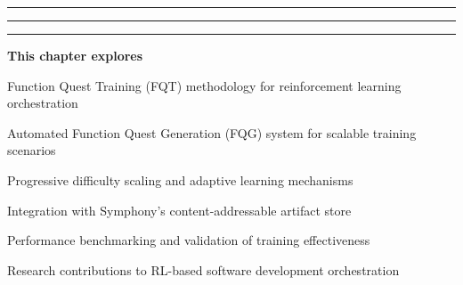 \vspace{0.5cm}

\begin{center}
\textcolor{brandAccent}{
\rule{2cm}{0.8pt} \quad
\raisebox{-0.2ex}{\Large$\diamond$} \quad
\rule{4cm}{0.8pt} \quad
\raisebox{-0.2ex}{\Large$\diamond$} \quad
\rule{2cm}{0.8pt}
}
\end{center}

\vspace{2cm}

\begin{tcolorbox}[
    enhanced,
    colback=white,
    colframe=brandPrimary!40,
    boxrule=1pt,
    arc=12pt,
    drop shadow={brandPrimary!20},
    left=1.5cm,
    right=1.5cm,
    top=1.2cm,
    bottom=1.2cm,
    before upper={\parindent0pt}
]
\begin{center}
{\Large\textbf{\textcolor{brandPrimary}{This chapter explores}}}
\end{center}

\vspace{0.8cm}

\begin{compactlist}
    \item {\large Function Quest Training (FQT) methodology for reinforcement learning orchestration}
    \item {\large Automated Function Quest Generation (FQG) system for scalable training scenarios}
    \item {\large Progressive difficulty scaling and adaptive learning mechanisms}
    \item {\large Integration with Symphony's content-addressable artifact store}
    \item {\large Performance benchmarking and validation of training effectiveness}
    \item {\large Research contributions to RL-based software development orchestration}
\end{compactlist}
\end{tcolorbox}

\clearpage
